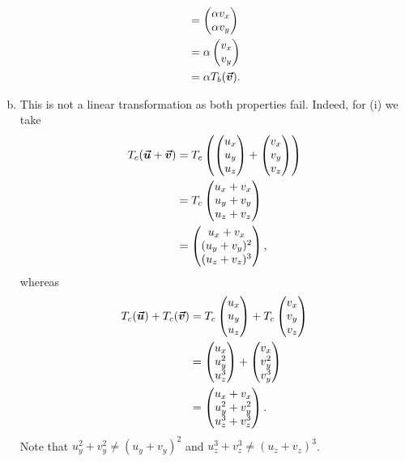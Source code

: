 \documentclass[12pt]{article} %
\begin{document}
\begin{solution}
\begin{enumerate}[(a)]
\begin{align*}
        &= \begin{pmatrix} \alpha v_x \\ \alpha v_y \end{pmatrix}\\
        &= \alpha \begin{pmatrix} v_x \\ v_y \end{pmatrix}\\
        &= \alpha T_b(\boldsymbol{\vec{v}}).
    \end{align*}
    \item This is not a linear transformation as both properties fail. Indeed, for (i) we take
    \begin{align*}
        T_c(\boldsymbol{\vec{u}} +\boldsymbol{\vec{v}}) &= T_c \left( \begin{pmatrix} u_x \\ u_y \\ u_z \end{pmatrix} + \begin{pmatrix} v_x \\ v_y \\ v_z \end{pmatrix} \right)\\
        &= T_c \begin{pmatrix} u_x + v_x \\ u_y + v_y \\ u_z + v_z \end{pmatrix}\\
        &= \begin{pmatrix} u_x + v_x \\ (u_y + v_y)^2 \\ (u_z + v_z)^3 \end{pmatrix},
    \end{align*}
    whereas 
    \begin{align*}
    T_c (\boldsymbol{\vec{u}})+T_c(\boldsymbol{\vec{v}}) &= T_c \begin{pmatrix} u_x \\ u_y \\ u_z \end{pmatrix} +T_c\begin{pmatrix} v_x \\ v_y \\ v_z \end{pmatrix}\\
    &= \begin{pmatrix} u_x \\ u_y^2 \\ u_z^3 \end{pmatrix} + \begin{pmatrix} v_x \\ v_y^2 \\ v_y^3 \end{pmatrix}\\
    &= \begin{pmatrix} u_x + v_x \\ u_y^2 + v_y^2 \\ u_z^3 + v_z^3 \end{pmatrix}.
    \end{align*}
    Note that $u_y^2+v_y^2\neq (u_y+v_y)^2$ and $u_z^3+v_z^3\neq (u_z+v_z)^3$. 
    

\end{enumerate}
\end{solution}
\end{document}
